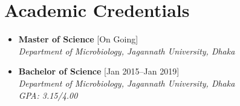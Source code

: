 \documentclass[11pt,a4paper]{moderncv}
\begin{document}
\hskip-2.5cm\makecvtitle
\section{Academic Credentials}
\begin{itemize}
\item \textbf{Master of Science} \hfill [On Going]\\
\textit{Department of Microbiology, Jagannath University, Dhaka}
\item \textbf{Bachelor of Science} \hfill [Jan 2015--Jan 2019]\\
\textit{Department of Microbiology, Jagannath University, Dhaka\\ GPA: 
3.15/4.00}
\end{itemize}
\end{document}

